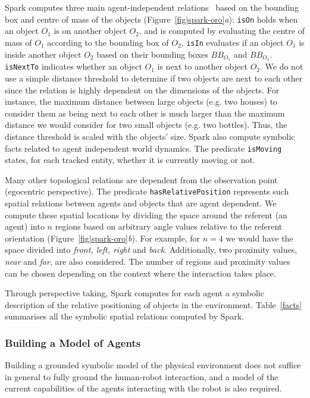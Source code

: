 \documentclass[preprint,3p,times]{elsarticle}
\newcommand{\concept}[1]{{\small \texttt{#1}}}
\newcommand{\eg}{e.g.\xspace}
\begin{document}
{\sc Spark} computes three main agent-independent relations~\cite{Sisbot2011}
based on the bounding box and centre of mass of the objects
(Figure~\ref{fig|spark-oro}\emph{a}): \concept{isOn} holds when an object $O_1$
is on another object $O_2$, and is computed by evaluating the centre of mass of
$O_1$ according to the bounding box of $O_2$.  \concept{isIn} evaluates if an
object $O_1$ is inside another object $O_2$ based on their bounding boxes
$BB_{O_1}$ and $BB_{O_2}$.  \concept{isNextTo} indicates whether an object $O_1$
is next to another object $O_2$. We do not use a simple distance threshold to
determine if two objects are next to each other since the relation is highly
dependent on the dimensions of the objects. For instance, the maximum distance
between large objects (\eg two houses) to consider them as being next to each
other is much larger than the maximum distance we would consider for two small
objects (\eg two bottles). Thus, the distance threshold is scaled with the
objects' size. {\sc Spark} also compute symbolic facts related to agent
independent world dynamics.  The predicate \concept{isMoving} states, for each
tracked entity, whether it is currently moving or not.

Many other topological relations are dependent from the observation point
(egocentric perspective).  The predicate \concept{hasRelativePosition}
represents such spatial relations between agents and objects that are agent
dependent.  We compute these spatial locations by dividing the space around the
referent (an agent) into $n$ regions based on arbitrary angle values relative to
the referent orientation (Figure~\ref{fig|spark-oro}\emph{b}).  For example, for
$n = 4$ we would have the space divided into \emph{front, left, right} and
\emph{back}. Additionally, two proximity values, \emph{near} and \emph{far}, are
also considered. The number of regions and proximity values can be chosen
depending on the context where the interaction takes place.

Through perspective taking, {\sc Spark} computes for each agent a symbolic
description of the relative positioning of objects in the environment.
Table~\ref{facts} summarises all the symbolic spatial relations computed by {\sc
Spark}.

\subsubsection{Building a Model of Agents}
\label{sect|grounding_agents}

Building a grounded symbolic model of the physical environment does not suffice
in general to fully ground the human-robot interaction, and a model of the
current capabilities of the agents interacting with the robot is also required.
\end{document}
